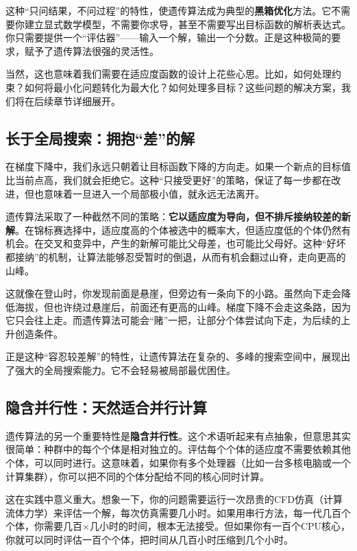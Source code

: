 \documentclass[lang=cn,zihao=-4,a4paper,fontset=windows]{beautybook}
\begin{document}
这种“只问结果，不问过程”的特性，使遗传算法成为典型的\textbf{黑箱优化}方法。它不需要你建立显式数学模型，不需要你求导，甚至不需要写出目标函数的解析表达式。你只需要提供一个“评估器”——输入一个解，输出一个分数。正是这种极简的要求，赋予了遗传算法很强的灵活性。

当然，这也意味着我们需要在适应度函数的设计上花些心思。比如，如何处理约束？如何将最小化问题转化为最大化？如何处理多目标？这些问题的解决方案，我们将在后续章节详细展开。

\subsection{长于全局搜索：拥抱“差”的解}

在梯度下降中，我们永远只朝着让目标函数下降的方向走。如果一个新点的目标值比当前点高，我们就会拒绝它。这种“只接受更好”的策略，保证了每一步都在改进，但也意味着一旦进入一个局部极小值，就永远无法离开。

遗传算法采取了一种截然不同的策略：\textbf{它以适应度为导向，但不排斥接纳较差的新解}。在锦标赛选择中，适应度高的个体被选中的概率大，但适应度低的个体仍然有机会。在交叉和变异中，产生的新解可能比父母差，也可能比父母好。这种“好坏都接纳”的机制，让算法能够忍受暂时的倒退，从而有机会翻过山脊，走向更高的山峰。

这就像在登山时，你发现前面是悬崖，但旁边有一条向下的小路。虽然向下走会降低海拔，但也许绕过悬崖后，前面还有更高的山峰。梯度下降不会走这条路，因为它只会往上走。而遗传算法可能会“赌”一把，让部分个体尝试向下走，为后续的上升创造条件。

正是这种“容忍较差解”的特性，让遗传算法在复杂的、多峰的搜索空间中，展现出了强大的全局搜索能力。它不会轻易被局部最优困住。

\subsection{隐含并行性：天然适合并行计算}

遗传算法的另一个重要特性是\textbf{隐含并行性}。这个术语听起来有点抽象，但意思其实很简单：种群中的每个个体是相对独立的。评估每个个体的适应度不需要依赖其他个体，可以同时进行。这意味着，如果你有多个处理器（比如一台多核电脑或一个计算集群），你可以把不同的个体分配给不同的核心同时计算。

这在实践中意义重大。想象一下，你的问题需要运行一次昂贵的CFD仿真（计算流体力学）来评估一个解，每次仿真需要几小时。如果用串行方法，每一代几百个个体，你需要几百×几小时的时间，根本无法接受。但如果你有一百个CPU核心，你就可以同时评估一百个个体，把时间从几百小时压缩到几个小时。
\end{document}
